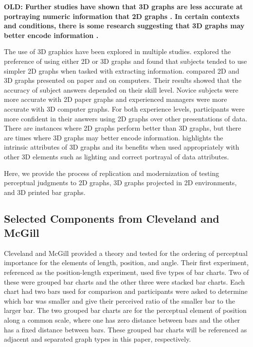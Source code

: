 \documentclass[letterpaper,inpress]{jdsart}
\begin{document}
\textbf{OLD: Further studies have shown that 3D graphs are less accurate at portraying numeric information that 2D graphs \citep{barfield_effects_1989,fisher_data_1997}. In certain contexts and conditions, there is some research suggesting that 3D graphs may better encode information \citep{brath_3d_2014}.}

The use of 3D graphics have been explored in multiple studies.
\citet{fisher_data_1997} explored the preference of using either 2D or 3D graphs and found that subjects tended to use simpler 2D graphs when tasked with extracting information. \citet{barfield_effects_1989} compared 2D and 3D graphs presented on paper and on computers.
Their results showed that the accuracy of subject answers depended on their skill level.
Novice subjects were more accurate with 2D paper graphs and experienced managers were more accurate with 3D computer graphs.
For both experience levels, participants were more confident in their answers using 2D graphs over other presentations of data.
There are instances where 2D graphs perform better than 3D graphs, but there are times where 3D graphs may better encode information.
\citet{brath_3d_2014} highlights the intrinsic attributes of 3D graphs and its benefits when used appropriately with other 3D elements such as lighting and correct portrayal of data attributes.

Here, we provide the process of replication and modernization of testing perceptual judgments to 2D graphs, 3D graphs projected in 2D environments, and 3D printed bar graphs.

\hypertarget{selected-components-from-cleveland-and-mcgill}{%
\subsection{Selected Components from Cleveland and McGill}\label{selected-components-from-cleveland-and-mcgill}}

Cleveland and McGill provided a theory and tested for the ordering of perceptual importance for the elements of length, position, and angle.
Their first experiment, referenced as the position-length experiment, used five types of bar charts.
Two of these were grouped bar charts and the other three were stacked bar charts.
Each chart had two bars used for comparison and participants were asked to determine which bar was smaller and give their perceived ratio of the smaller bar to the larger bar.
The two grouped bar charts are for the perceptual element of position along a common scale, where one has zero distance between bars and the other has a fixed distance between bars.
These grouped bar charts will be referenced as adjacent and separated graph types in this paper, respectively.
\end{document}
